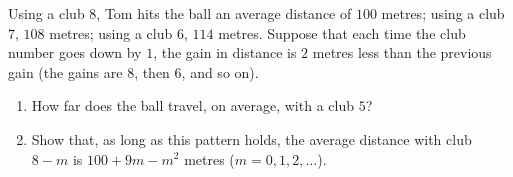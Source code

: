 Using a club $8$, Tom hits the ball an average distance of $100$ metres; using a club $7$, $108$ metres; using a club $6$, $114$ metres. Suppose that each time the club number goes down by $1$, the gain in distance is $2$ metres less than the previous gain (the gains are $8$, then $6$, and so on).
\begin{enumerate}
\item[(a)] How far does the ball travel, on average, with a club $5$?
\item[(b)] Show that, as long as this pattern holds, the average distance with club $8-m$ is $100+9m-m^2$ metres ($m=0,1,2,\dots$).
\end{enumerate}
